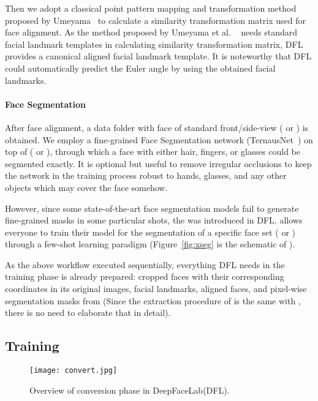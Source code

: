 \documentclass[10pt,twocolumn,letterpaper]{article}
\begin{document}
Then we adopt a classical point pattern mapping and transformation method proposed by Umeyama~\cite{umeyama1991least} to calculate a similarity transformation matrix used for face alignment. 
As the method proposed by Umeyama et al. ~\cite{umeyama1991least} needs standard facial landmark templates in calculating similarity transformation matrix, DFL provides a canonical aligned facial landmark template. It is noteworthy that DFL could automatically predict the Euler angle by using the obtained facial landmarks.

\paragraph{Face Segmentation}\label{para:segmentation} After face alignment, a data folder with face of standard front/side-view (  or  ) is obtained. We employ a fine-grained Face Segmentation network (TernausNet~\cite{iglovikov2018ternausnet}) on top of (  or  ), through which a face with either hair, fingers, or glasses could be segmented exactly. It is optional but useful to remove irregular occlusions to keep the network in the training process robust to hands, glasses, and any other objects which may cover the face somehow.

However, since some state-of-the-art face segmentation models fail to generate fine-grained masks in some particular shots, the  was introduced in DFL.  allows everyone to train their model for the segmentation of a specific face set (  or  ) through a few-shot learning paradigm (Figure~\ref{fig:xseg} is the schematic of ).

As the above workflow executed sequentially, everything DFL needs in the training phase is already prepared: cropped faces with their corresponding coordinates in its original images, facial landmarks, aligned faces, and pixel-wise segmentation masks from  (Since the extraction procedure of  is the same with , there is no need to elaborate that in detail).

\subsection{Training}


\begin{figure*}[h]
	\begin{center}
		\texttt{[image: convert.jpg]}
	\end{center}
	\caption{Overview of conversion phase in DeepFaceLab(DFL).}
	\label{fig:long4}
	\label{fig:onecol4}
\end{figure*}
\end{document}
